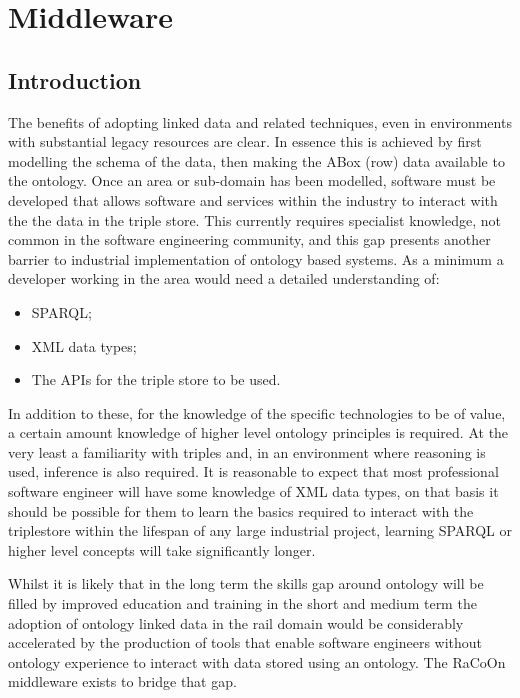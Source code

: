 \chapter{Middleware}\label{ch:middleware}
\section{Introduction}\label{sec:mwintro}
The benefits of adopting linked data and related techniques, even in environments with substantial legacy resources are clear. In essence this is achieved by first modelling the schema of the data, then making the ABox (row) data available to the ontology. Once an area or sub-domain has been modelled, software must be developed that allows software and services within the industry to interact with the the data in the triple store. This currently requires specialist knowledge, not common in the software engineering community, and this gap presents another barrier to industrial implementation of ontology based systems. As a minimum a developer working in the area would need a detailed understanding of:
\begin{itemize}
    \item SPARQL;
    \item XML data types;
    \item The APIs for the triple store to be used.
\end{itemize}

In addition to these, for the knowledge of the specific technologies to be of value, a certain amount knowledge of higher level ontology principles is required. At the very least a familiarity with triples and, in an environment where reasoning is used, inference is also required. It is reasonable to expect that most professional software engineer will have some knowledge of XML data types, on that basis it should be possible for them to learn the basics required to interact with the triplestore within the lifespan of any large industrial project, learning SPARQL or higher level concepts will take significantly longer.

Whilst it is likely that in the long term the skills gap around ontology will be filled by improved education and training in the short and medium term the adoption of ontology linked data in the rail domain would be considerably accelerated by the production of tools that enable software engineers without ontology experience to interact with data stored using an ontology. The RaCoOn middleware exists to bridge that gap.


